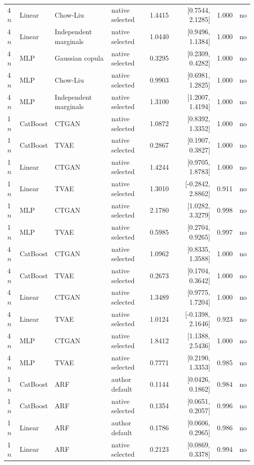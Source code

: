 \begin{longtable}{llllrrrl}
4$n$ & Linear & Chow-Liu & native selected & 1.4415 & [0.7544, 2.1285] & 1.000 & no \\
4$n$ & Linear & Independent marginals & native selected & 1.0440 & [0.9496, 1.1384] & 1.000 & no \\
4$n$ & MLP & Gaussian copula & native selected & 0.3295 & [0.2309, 0.4282] & 1.000 & no \\
4$n$ & MLP & Chow-Liu & native selected & 0.9903 & [0.6981, 1.2825] & 1.000 & no \\
4$n$ & MLP & Independent marginals & native selected & 1.3100 & [1.2007, 1.4194] & 1.000 & no \\
1$n$ & CatBoost & CTGAN & native selected & 1.0872 & [0.8392, 1.3352] & 1.000 & no \\
1$n$ & CatBoost & TVAE & native selected & 0.2867 & [0.1907, 0.3827] & 1.000 & no \\
1$n$ & Linear & CTGAN & native selected & 1.4244 & [0.9705, 1.8783] & 1.000 & no \\
1$n$ & Linear & TVAE & native selected & 1.3010 & [-0.2842, 2.8862] & 0.911 & no \\
1$n$ & MLP & CTGAN & native selected & 2.1780 & [1.0282, 3.3279] & 0.998 & no \\
1$n$ & MLP & TVAE & native selected & 0.5985 & [0.2704, 0.9265] & 0.997 & no \\
4$n$ & CatBoost & CTGAN & native selected & 1.0962 & [0.8335, 1.3588] & 1.000 & no \\
4$n$ & CatBoost & TVAE & native selected & 0.2673 & [0.1704, 0.3642] & 1.000 & no \\
4$n$ & Linear & CTGAN & native selected & 1.3489 & [0.9775, 1.7204] & 1.000 & no \\
4$n$ & Linear & TVAE & native selected & 1.0124 & [-0.1398, 2.1646] & 0.923 & no \\
4$n$ & MLP & CTGAN & native selected & 1.8412 & [1.1388, 2.5436] & 1.000 & no \\
4$n$ & MLP & TVAE & native selected & 0.7771 & [0.2190, 1.3353] & 0.985 & no \\
1$n$ & CatBoost & ARF & author default & 0.1144 & [0.0426, 0.1862] & 0.984 & no \\
1$n$ & CatBoost & ARF & native selected & 0.1354 & [0.0651, 0.2057] & 0.996 & no \\
1$n$ & Linear & ARF & author default & 0.1786 & [0.0606, 0.2965] & 0.986 & no \\
1$n$ & Linear & ARF & native selected & 0.2123 & [0.0869, 0.3378] & 0.994 & no \\

\end{longtable}
